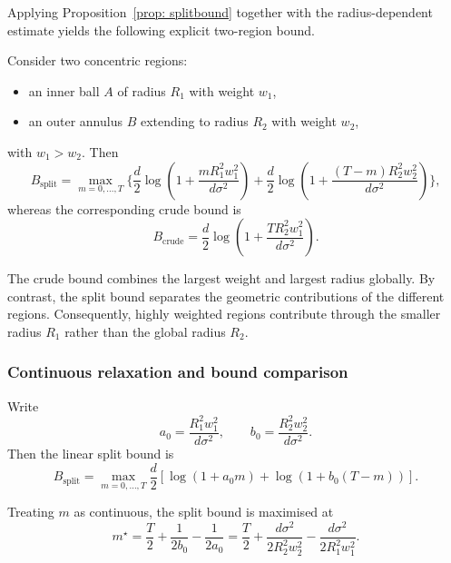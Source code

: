 Applying Proposition~\ref{prop: splitbound} together with the radius-dependent estimate yields the following explicit two-region bound.

\begin{corollary}
Consider two concentric regions:
\begin{itemize}
    \item an inner ball $A$ of radius $R_1$ with weight $w_1$,
    \item an outer annulus $B$ extending to radius $R_2$ with weight $w_2$,
\end{itemize}
with $w_1>w_2.$ Then
\begin{equation*}
B_{\mathrm{split}} =
\max_{m=0,\dots,T}
\Bigg\{
\frac{d}{2}
\log
\left(
1+\frac{mR_1^2w_1^2}{d\sigma^2}
\right)
+
\frac{d}{2}
\log
\left(
1+\frac{(T-m)R_2^2w_2^2}{d\sigma^2}
\right)
\Bigg\},
\end{equation*}
whereas the corresponding crude bound is
\begin{equation*}
B_{\mathrm{crude}}
=
\frac{d}{2}
\log
\left(
1+\frac{TR_2^2w_1^2}{d\sigma^2}
\right).
\end{equation*}
\end{corollary}

\begin{remark}
The crude bound combines the largest weight and largest radius globally. By contrast, the split bound separates the geometric contributions of the different regions. Consequently, highly weighted regions contribute through the smaller radius $R_1$ rather than the global radius $R_2$.
\end{remark}

\subsubsection{Continuous relaxation and bound comparison}

Write
\begin{equation*}
a_0
=
\frac{R_1^2w_1^2}{d\sigma^2},
\qquad
b_0
=
\frac{R_2^2w_2^2}{d\sigma^2}.
\end{equation*}
Then the linear split bound is
\begin{equation*}
B_{\mathrm{split}}
=
\max_{m=0,\dots,T}
\frac{d}{2}
\left[
\log(1+a_0m)
+
\log(1+b_0(T-m))
\right].
\end{equation*}

\begin{lemma}
Treating $m$ as continuous, the split bound is maximised at
\begin{equation*}
m^\star=
\frac{T}{2}
+
\frac{1}{2b_0}
-
\frac{1}{2a_0}
=
\frac{T}{2}
+
\frac{d\sigma^2}{2R_2^2w_2^2}
-
\frac{d\sigma^2}{2R_1^2w_1^2}.
\end{equation*}
\end{lemma}

